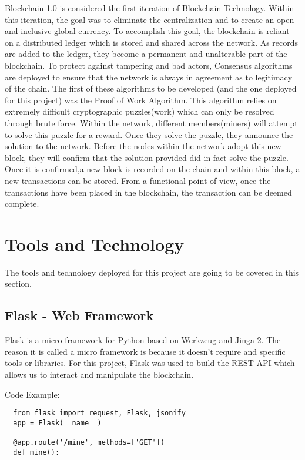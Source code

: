 Blockchain 1.0 is considered the first iteration of Blockchain Technology. 
Within this iteration, the goal was to eliminate the centralization and to 
create an open and inclusive global currency. To accomplish this goal, the 
blockchain is reliant on a distributed ledger which is stored and shared across 
the network. As records are added to the ledger, they become a permanent and 
unalterable part of the blockchain. To protect against tampering and bad actors, 
Consensus algorithms are deployed to ensure that the network is always in 
agreement as to legitimacy of the chain. The first of these algorithms to be developed (and 
the one deployed for this project) was the Proof of Work Algorithm. This 
algorithm relies on extremely difficult cryptographic puzzles(work) which can 
only be resolved through brute force. Within the network, different 
members(miners) will attempt to solve this puzzle for a reward. Once they solve 
the puzzle, they announce the solution to the network. Before the  nodes within the network 
adopt this new block, they will confirm that the solution provided did in fact solve the 
puzzle. Once it is confirmed,a new block is recorded on the chain and within this block, a new 
transactions can be stored. From a functional point of view, once the transactions have been 
placed in the blockchain, the transaction can be deemed complete.  


\section{Tools and Technology}

The tools and technology deployed for this project are going to be covered in 
this section.

\subsection{Flask - Web Framework}

Flask is a micro-framework for Python based on Werkzeug and Jinga 2. The reason 
it is called a micro framework is because it doesn't require and specific tools 
or libraries. For this project, Flask was used to build the REST API which 
allows us to interact and manipulate the blockchain. 

Code Example:
\begin{verbatim}
  from flask import request, Flask, jsonify
  app = Flask(__name__)

  @app.route('/mine', methods=['GET'])
  def mine():
  	
\end{verbatim} 

